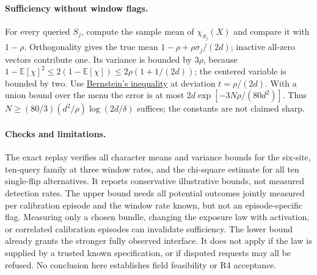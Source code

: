 \documentclass{article}
\begin{document}
\paragraph{Sufficiency without window flags.}
For every queried \(S_j\), compute the sample mean of
\(\chi_{S_j}(X)\) and compare it with \(1-\rho\).
Orthogonality gives the true mean
\(1-\rho+\rho\sigma_j/(2d)\); inactive all-zero vectors
contribute one. Its variance is bounded by \(3\rho\), because
\(1-\mathbb E[\chi]^2\le2(1-\mathbb E[\chi])
 \le2\rho(1+1/(2d))\); the centered variable is bounded by two.
Use
\href{https://tropp.caltech.edu/notes/Tro21-Probability-High-LN-corr.pdf}{Bernstein's inequality}
at deviation \(t=\rho/(2d)\). With a union bound over the
menu the error is at most
\(2d\exp[-3N\rho/(80d^2)]\).
Thus \(N\ge(80/3)(d^2/\rho)\log(2d/\delta)\) suffices;
the constants are not claimed sharp.

\paragraph{Checks and limitations.}
The exact replay verifies all character means and variance
bounds for the six-site, ten-query family at three window rates,
and the chi-square estimate for all ten single-flip alternatives.
It reports conservative illustrative bounds, not measured
detection rates. The upper bound needs all potential outcomes
jointly measured per calibration episode and the window rate
known, but not an episode-specific flag. Measuring only a
chosen bundle, changing the exposure law with activation, or
correlated calibration episodes can invalidate sufficiency.
The lower bound already grants the stronger fully observed
interface. It does not apply if the law is supplied by a trusted
known specification, or if disputed requests may all be refused.
No conclusion here establishes field feasibility or R4 acceptance.
\end{document}
